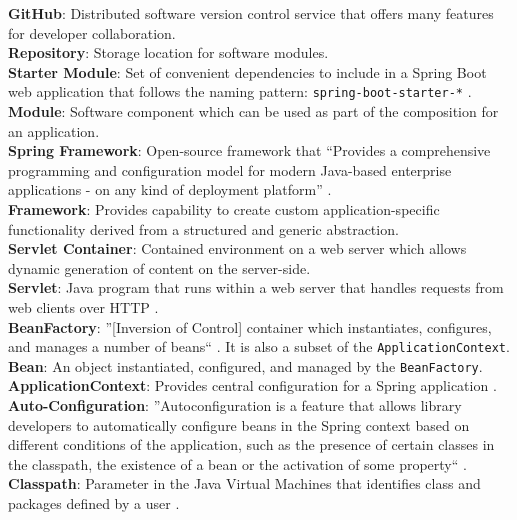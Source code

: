 {
\obeylines
\setlength\parindent{0pt}

\textbf{GitHub}: Distributed software version control service that offers many features for developer collaboration.\\
\textbf{Repository}: Storage location for software modules.\\
\textbf{Starter Module}: Set of convenient dependencies to include in a Spring Boot web application that follows the naming pattern: \texttt{spring-boot-starter-*} \cite{springbootstarters:online}.\\
\textbf{Module}: Software component which can be used as part of the composition for an application.\\
\textbf{Spring Framework}: Open-source framework that ``Provides a comprehensive programming and configuration model for modern Java-based enterprise applications - on any kind of deployment platform'' \cite{springframework:online}.\\
\textbf{Framework}: Provides capability to create custom application-specific functionality derived from a structured and generic abstraction.\\
\textbf{Servlet Container}: Contained environment on a web server which allows dynamic generation of content on the server-side.\\
\textbf{Servlet}: Java program that runs within a web server that handles requests from web clients over HTTP \cite{servlet:online}.\\
\textbf{BeanFactory}: ''[Inversion of Control] container which instantiates, configures, and manages a number of beans`` \cite{springdefinitions:online}. It is also a subset of the \texttt{ApplicationContext}.\\
\textbf{Bean}: An object instantiated, configured, and managed by the \texttt{BeanFactory}.\\
\textbf{ApplicationContext}: Provides central configuration for a Spring application \cite{springjavadoc:online}.\\
\textbf{Auto-Configuration}: ''Autoconfiguration is a feature that allows library developers to automatically configure beans in the Spring context based on different conditions of the application, such as the presence of certain classes in the classpath, the existence of a bean or the activation of some property`` \cite{springautoconfiguration:online}.\\
\textbf{Classpath}: Parameter in the Java Virtual Machines that identifies class and packages defined by a user \cite{wikiclasspath:online}.\\
}
